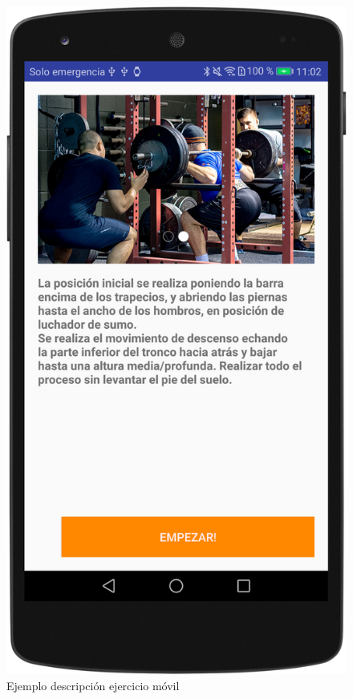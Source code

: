 \begin{figure}[H]
	\centering
	\includegraphics[scale=0.10]{imagenes/m5.png}
	\caption{Ejemplo descripción ejercicio móvil}
	\label{Realización ejercicio 3}
\end{figure}

